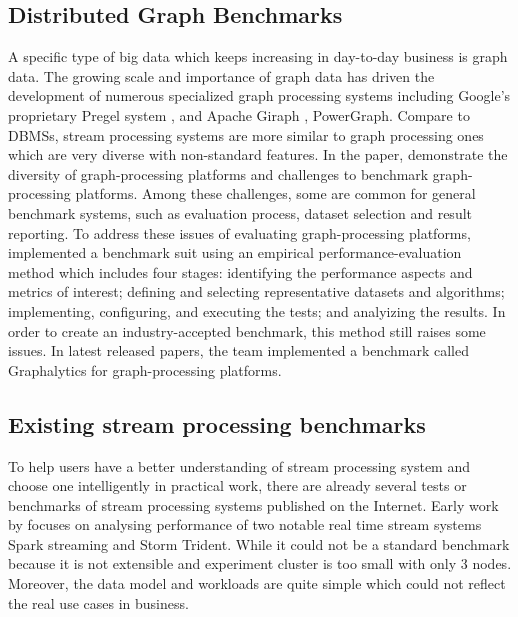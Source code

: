 \subsection{ Distributed Graph Benchmarks}

A specific type of big data which keeps increasing in day-to-day business is graph data. The growing scale and importance of graph data has driven the development of numerous specialized graph processing systems including Google's proprietary Pregel system \cite{Pregel}, and Apache Giraph \cite{Giraph}, PowerGraph\cite{PowerGraph}. Compare to DBMSs, stream processing systems are more similar to graph processing ones which are very diverse with non-standard features. In the paper, \citet{guo2014benchmarking} demonstrate the diversity of graph-processing platforms and challenges to benchmark graph-processing platforms. Among these challenges, some are common for general benchmark systems, such as evaluation process, dataset selection and result reporting. To address these issues of evaluating graph-processing platforms, \citeauthor{guo2014well} implemented a benchmark suit using an empirical performance-evaluation method which includes four stages: identifying the performance aspects and metrics of interest; defining and selecting representative datasets and algorithms; implementing, configuring, and executing the tests; and analyizing the results. In order to create an industry-accepted benchmark, this method still raises some issues. In latest released papers\cite{iosup2014towards, capota2015graphalytics}, the team implemented a benchmark called Graphalytics for graph-processing platforms. 

\subsection{ Existing stream processing benchmarks}

To help users have a better understanding of stream processing system and choose one intelligently in practical work, there are already several tests or benchmarks of stream processing systems published on the Internet. Early work by \citet{cordovaanalysis} focuses on analysing performance of two notable real time stream systems Spark streaming and Storm Trident. While it could not be a standard benchmark because it is not extensible and experiment cluster is too small with only 3 nodes. Moreover, the data model and workloads are quite simple which could not reflect the real use cases in business. 


